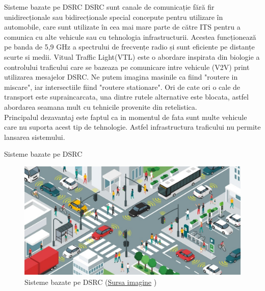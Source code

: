 \documentclass{beamer}
\begin{document}
    \begin{frame}{Sisteme bazate pe DSRC}
        DSRC sunt canale de comunicație fără fir unidirecționale sau
        bidirecționale special concepute pentru utilizare în automobile,
        care sunt utilizate în cea mai mare parte de către ITS pentru a
        comunica cu alte vehicule sau cu tehnologia infrastructurii.
        Acestea funcționează pe banda de 5,9 GHz a spectrului de frecvențe
        radio și sunt eficiente pe distanțe scurte si medii.
        Vitual Traffic Light(VTL) este o abordare inspirata din biologie 
        a controlului traficului care se bazeaza pe comunicare intre 
        vehicule (V2V) print utilizarea mesajelor DSRC.
        Ne putem imagina masinile ca fiind "routere in miscare", iar 
        intersectiile fiind "routere stationare". Ori de cate ori o 
        cale de transport este supraincarcata, una dintre rutele alternative 
        este blocata, astfel abordarea seamana mult cu tehnicile provenite 
        din retelistica.\\
        Principalul dezavantaj este faptul ca in momentul de fata sunt 
        multe vehicule care nu suporta acest tip de tehnologie. Astfel 
        infrastructura traficului nu permite lansarea sistemului.
    \end{frame}

    \begin{frame}{Sisteme bazate pe DSRC}
        \begin{figure}[h!]
            \includegraphics[width=\textwidth]{DSRCSystemModel.jpg}
            \caption{Sisteme bazate pe DSRC 
            (\href{https://www.frost.com/frost-perspectives/what-is-required-for-a-scalable-and-industry-wide-vehicle-to-everything-v2x-deployment/}{Sursa imagine} \textcopyright)}
            \label{fig:DSRCSystemModel}
        \end{figure}
        
    \end{frame}
\end{document}
